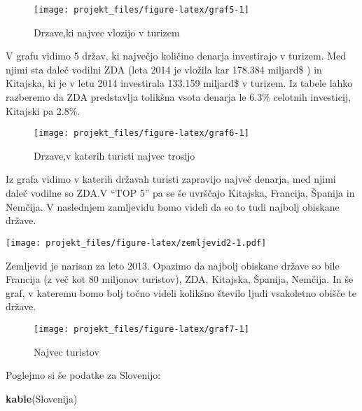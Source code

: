\documentclass[]{article}
\newenvironment{Shaded}{\begin{snugshade}}{\end{snugshade}}
\newcommand{\KeywordTok}[1]{\textcolor[rgb]{0.13,0.29,0.53}{\textbf{{#1}}}}
\newcommand{\NormalTok}[1]{{#1}}
\begin{document}
\begin{figure}

{\centering \texttt{[image: projekt\_files/figure-latex/graf5-1]} 

}

\caption{Drzave,ki najvec vlozijo v turizem}\label{fig:graf5}
\end{figure}

V grafu vidimo 5 držav, ki največjo količino denarja investirajo v
turizem. Med njimi sta daleč vodilni ZDA (leta 2014 je vložila kar
178.384 miljard\$ ) in Kitajska, ki je v letu 2014 investirala 133.159
miljard\$ v turizem. Iz tabele lahko razberemo da ZDA predstavlja
tolikšna vsota denarja le 6.3\% celotnih investicij, Kitajski pa 2.8\%.

\begin{figure}

{\centering \texttt{[image: projekt\_files/figure-latex/graf6-1]} 

}

\caption{Drzave,v katerih turisti najvec trosijo}\label{fig:graf6}
\end{figure}

Iz grafa vidimo v katerih državah turisti zapravijo največ denarja, med
njimi daleč vodilne so ZDA.V ``TOP 5'' pa se še uvrščajo Kitajska,
Francija, Španija in Nemčija. V naslednjem zamljevidu bomo videli da so
to tudi najbolj obiskane države.

\texttt{[image: projekt\_files/figure-latex/zemljevid2-1.pdf]}

Zemljevid je narisan za leto 2013. Opazimo da najbolj obiskane države so
bile Francija (z več kot 80 miljonov turistov), ZDA, Kitajska, Španija,
Nemčija. In še graf, v kateremu bomo bolj točno videli kolikšno število
ljudi vsakoletno obišče te države.

\begin{figure}

{\centering \texttt{[image: projekt\_files/figure-latex/graf7-1]} 

}

\caption{Najvec turistov}\label{fig:graf7}
\end{figure}

Poglejmo si še podatke za Slovenijo:

\begin{Shaded}
\begin{Highlighting}[]
\KeywordTok{kable}\NormalTok{(Slovenija)}
\end{Highlighting}
\end{Shaded}
\end{document}
